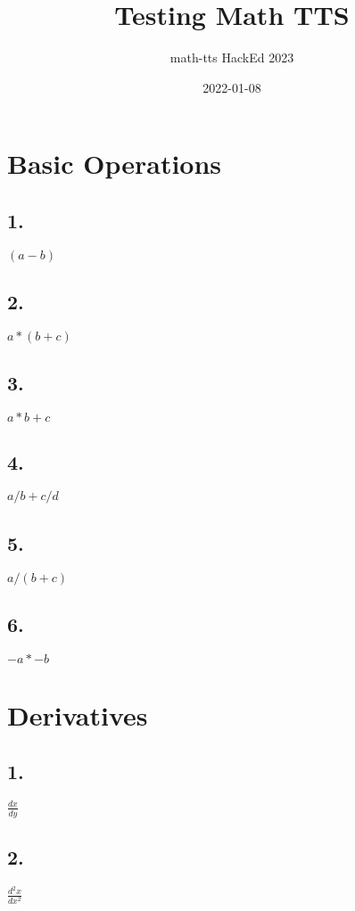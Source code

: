 \title{Testing Math TTS}
\author{math-tts HackEd 2023}
\date{2022-01-08}



\maketitle

\section*{Basic Operations}

\subsection*{1.}
$(a-b)$

\subsection*{2.}
$a*(b+c)$

\subsection*{3.}
$a*b+c$

\subsection*{4.}
$a/b+c/d$

\subsection*{5.}
$a/(b+c)$

\subsection*{6.}
$-a*-b$

\section*{Derivatives}

\subsection*{1.}
$\frac{dx}{dy}$

\subsection*{2.}
$\frac{d^2x}{dx^2}$

